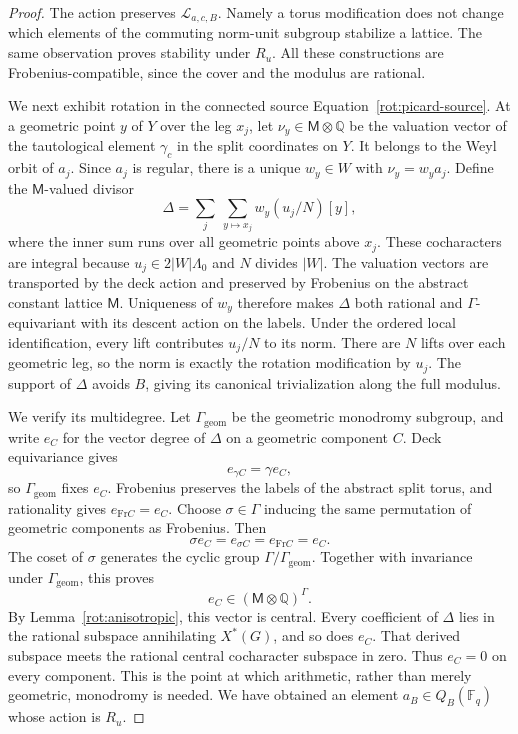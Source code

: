 \begin{proof}
The action preserves $\mathcal L_{a,c,B}$.  Namely a torus modification
does not change which elements of the commuting norm-unit subgroup
stabilize a lattice.  The same observation proves stability under
$R_u$.  All these constructions are Frobenius-compatible, since the
cover and the modulus are rational.

We next exhibit rotation in the connected source
Equation~\eqref{rot:picard-source}. At a geometric point $y$ of $Y$
over the leg $x_j$, let $\nu_y\in\mathsf M\otimes\mathbb Q$ be the
valuation vector of the tautological element $\gamma_c$ in the split
coordinates on $Y$. It belongs to the Weyl orbit of $a_j$.
Since $a_j$ is regular, there is a unique $w_y\in W$ with
$\nu_y=w_ya_j$.  Define the $\mathsf M$-valued divisor
\[
 \Delta=\sum_j\ \sum_{y\mapsto x_j}w_y(u_j/N)[y],
\]
where the inner sum runs over all geometric points above $x_j$.
These cocharacters are integral because $u_j\in2|W|\Lambda_0$ and
$N$ divides $|W|$. The valuation vectors are transported by the deck
action and preserved by Frobenius on the abstract constant lattice
$\mathsf M$. Uniqueness of $w_y$ therefore makes $\Delta$ both rational
and $\Gamma$-equivariant with its descent action on the labels.
Under the ordered local identification, every lift contributes
$u_j/N$ to its norm.  There are $N$ lifts over each geometric leg, so
the norm is exactly the rotation modification by $u_j$.
The support of $\Delta$ avoids $B$, giving its canonical
trivialization along the full modulus.

We verify its multidegree.  Let $\Gamma_{\mathrm{geom}}$ be the
geometric monodromy subgroup, and write $e_C$ for the vector degree of
$\Delta$ on a geometric component $C$.  Deck equivariance gives
\[
 e_{\gamma C}=\gamma e_C,
\]
so $\Gamma_{\mathrm{geom}}$ fixes $e_C$.  Frobenius preserves the labels
of the abstract split torus, and rationality gives
$e_{\mathrm{Fr}C}=e_C$.  Choose $\sigma\in\Gamma$ inducing the same
permutation of geometric components as Frobenius.  Then
\[
 \sigma e_C=e_{\sigma C}=e_{\mathrm{Fr}C}=e_C.
\]
The coset of $\sigma$ generates the cyclic group
$\Gamma/\Gamma_{\mathrm{geom}}$.  Together with invariance under
$\Gamma_{\mathrm{geom}}$, this proves
\begin{equation}\label{rot:component-degree}
 e_C\in(\mathsf M\otimes\mathbb Q)^\Gamma.
\end{equation}
By Lemma~\ref{rot:anisotropic}, this vector is central.  Every coefficient
of $\Delta$ lies in the rational subspace annihilating $X^*(G)$, and so
does $e_C$.  That derived subspace meets the rational central
cocharacter subspace in zero.  Thus $e_C=0$ on every component.
This is the point at which arithmetic, rather than merely geometric,
monodromy is needed.  We have obtained an element
$a_B\in Q_B(\mathbb F_q)$ whose action is $R_u$.


\end{proof}
